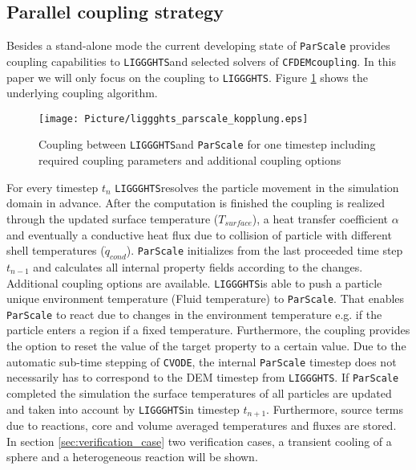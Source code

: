 \documentclass{particles2015}
\begin{document}
\subsection{Parallel coupling strategy}
Besides a stand-alone mode the current developing state of \texttt{ParScale} provides coupling capabilities to \texttt{LIGGGHTS}\textregistered  and selected solvers of \texttt{CFDEMcoupling}. In this paper we will only focus on the coupling to \texttt{LIGGGHTS}\textregistered. Figure \ref{fig:Coupling_parScale_LIGGGHTS} shows the underlying coupling algorithm.

\begin{figure}[h!]
   \centering
   \texttt{[image: Picture/liggghts\_parscale\_kopplung.eps]}
   \caption{Coupling between \texttt{LIGGGHTS}\textregistered and \texttt{ParScale} for one timestep including required coupling parameters and additional coupling options}
   \label{fig:Coupling_parScale_LIGGGHTS}
\end{figure}

For every timestep $t_n$ \texttt{LIGGGHTS}\textregistered resolves the particle movement in the simulation domain in advance. After the computation is finished the coupling is realized through the updated surface temperature ($T_{surface}$), a heat transfer coefficient $\alpha$ and eventually a conductive heat flux due to collision of particle with different shell temperatures ($\dot{q}_{cond}$). \texttt{ParScale} initializes from the last proceeded time step $t_{n-1}$ and calculates all internal property fields according to the changes. Additional coupling options are available. \texttt{LIGGGHTS}\textregistered is able to push a particle unique environment temperature (Fluid temperature) to \texttt{ParScale}. That enables \texttt{ParScale} to react due to changes in the environment temperature e.g. if the particle enters a region if a fixed temperature. Furthermore, the coupling provides the option to reset the value of the target property to a certain value. Due to the automatic sub-time stepping of \texttt{CVODE}, the internal \texttt{ParScale} timestep does not necessarily has to correspond to the DEM timestep from \texttt{LIGGGHTS}\textregistered. If \texttt{ParScale} completed the simulation the surface temperatures of all particles are updated and taken into account by \texttt{LIGGGHTS}\textregistered in timestep $t_{n+1}$. Furthermore, source terms due to reactions, core and volume averaged temperatures and fluxes are stored.\\
In section \ref{sec:verification_case} two verification cases, a transient cooling of a sphere and a heterogeneous reaction will be shown.
\end{document}
